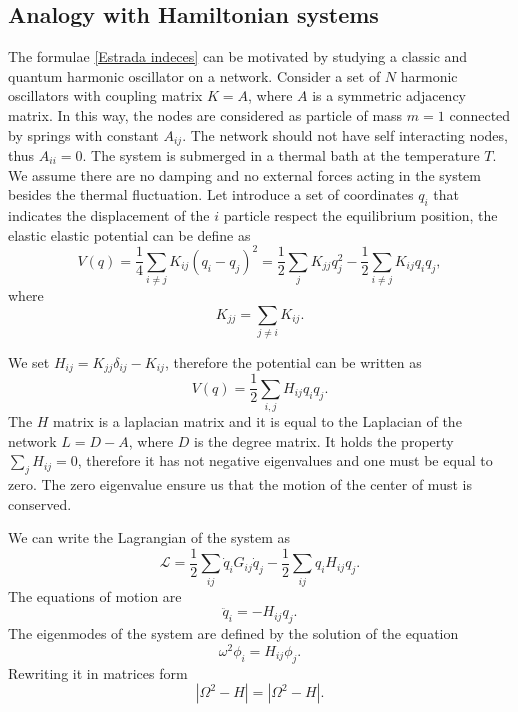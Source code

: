 
\subsection{Analogy with Hamiltonian systems}
The formulae \eqref{Estrada indeces} can be motivated by studying a classic and quantum harmonic oscillator on a network.
Consider a set of $N$ harmonic oscillators with coupling matrix $K = A$, where $A$ is a symmetric adjacency matrix. In this way, the nodes are considered as particle of mass $m = 1$ connected by springs with constant $A_{ij}$. The network should not have self interacting nodes, thus $A_{ii} = 0$. The system is submerged in a thermal bath at the temperature $T$. We assume there are no damping and no external forces acting in the system besides the thermal fluctuation. 
Let introduce a set of coordinates $q_i$ that indicates the displacement of the $i$ particle respect the equilibrium position, the elastic elastic potential can be define as
\begin{equation}
    V(q) = \frac{1}{4}\sum_{i\neq j} K_{ij}(q_i-q_j)^2 = \frac{1}{2}\sum_{j}K_{jj}q_j^2 - \frac{1}{2} \sum_{i\neq j}K_{ij}q_iq_j,
\end{equation}
where 
\begin{equation}
    K_{jj} = \sum_{j \neq i} K_{ij}.
\end{equation}

We set $H_{ij}= K_{jj}\delta_{ij} - K_{ij}$, therefore the potential can be written as
\begin{equation}
    V(q) = \frac{1}{2}\sum_{i,j} H_{ij} q_i q_j.
\end{equation}
The $H$ matrix is a laplacian matrix and it is equal to the Laplacian of the network $L = D - A$, where $D$ is the degree matrix. It holds the property $\sum_j H_{ij} = 0$, therefore it has not negative eigenvalues and one must be equal to zero.
The zero eigenvalue ensure us that the motion of the center of must is conserved. %

We can write the Lagrangian of the system as
\begin{equation}
    \mathcal{L} = \frac{1}{2}\sum_{ij} \dot q_i G_{ij} \dot q_j - \frac{1}{2} \sum_{ij} q_iH_{ij}q_j.
\end{equation}
The equations of motion are
\begin{equation}
    \ddot q_i = -H_{ij} q_j.
\end{equation}
The eigenmodes of the system are defined by the solution of the equation 
\begin{equation}
    \omega^2 \phi_i = H_{ij} \phi_j.
\end{equation}
Rewriting it in matrices form
\begin{equation}
    |\Omega^2 - H| = |\Omega^2 - H|.
\end{equation}

